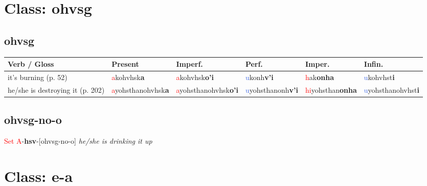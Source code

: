\documentclass[oneside,openany]{book}%
\begin{document}
\section*{Class: ohvsg}%
%
\needspace{1in}%
\subsection*{ohvsg}%
\begin{tabularx}{\textwidth}{>{\hsize=1.5\hsize\RaggedRight}X >{\hsize=0.9\hsize}X >{\hsize=0.9\hsize}X >{\hsize=0.9\hsize}X >{\hsize=0.9\hsize}X >{\hsize=0.9\hsize}X}%
\toprule%
\textbf{Verb / Gloss}&\textbf{Present}&\textbf{Imperf.}&\textbf{Perf.}&\textbf{Imper.}&\textbf{Infin.}\\%
\midrule%
it's burning (p. 52)&\textcolor{Red}{a}kohvhsk\textbf{a}&\textcolor{Red}{a}kohvhsk\textbf{o'i}&\textcolor{RoyalBlue}{u}konh\textbf{v'i}&\textcolor{Red}{h}ak\textbf{onha}&\textcolor{RoyalBlue}{u}kohvhst\textbf{i}\\%
he/she is destroying it (p. 202)&\textcolor{Red}{a}yohsthanohvhsk\textbf{a}&\textcolor{Red}{a}yohsthanohvhsk\textbf{o'i}&\textcolor{RoyalBlue}{u}yohsthanonh\textbf{v'i}&\textcolor{Red}{hi}yohsthan\textbf{onha}&\textcolor{RoyalBlue}{u}yohsthanohvhst\textbf{i}\\%
\bottomrule%
\end{tabularx}%
\vspace{1em}%
\needspace{1in}%
\subsection*{ohvsg-no-o}%
\textcolor{Red}{Set A}{-}\textbf{hsv}{-}[ohvsg-no-o] \textit{ he/she is drinking it up} \\%
\vspace{1em}%
\needspace{3in}%
\section*{Class: e-a}%
%
\needspace{1in}%
\end{document}
